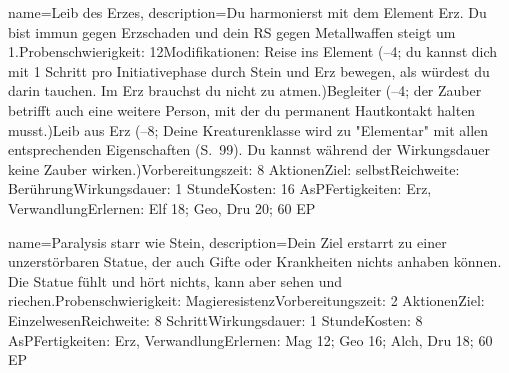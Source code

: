 {
    name={Leib des Erzes},
    description={Du harmonierst mit dem Element Erz. Du bist immun gegen Erzschaden und dein RS gegen Metallwaffen steigt um 1.\newline Probenschwierigkeit: 12\newline Modifikationen: Reise ins Element (–4; du kannst dich mit 1 Schritt pro Initiativephase durch Stein und Erz bewegen, als würdest du darin tauchen. Im Erz brauchst du nicht zu atmen.)\newline Begleiter (–4; der Zauber betrifft auch eine weitere Person, mit der du permanent Hautkontakt halten musst.)\newline Leib aus Erz (–8; Deine Kreaturenklasse wird zu "Elementar" mit allen entsprechenden Eigenschaften (S. 99). Du kannst während der Wirkungsdauer keine Zauber wirken.)\newline Vorbereitungszeit: 8 Aktionen\newline Ziel: selbst\newline Reichweite: Berührung\newline Wirkungsdauer: 1 Stunde\newline Kosten: 16 AsP\newline Fertigkeiten: Erz, Verwandlung\newline Erlernen: Elf 18; Geo, Dru 20; 60 EP}
}


{
    name={Paralysis starr wie Stein},
    description={Dein Ziel erstarrt zu einer unzerstörbaren Statue, der auch Gifte oder Krankheiten nichts anhaben können. Die Statue fühlt und hört nichts, kann aber sehen und riechen.\newline Probenschwierigkeit: Magieresistenz\newline Vorbereitungszeit: 2 Aktionen\newline Ziel: Einzelwesen\newline Reichweite: 8 Schritt\newline Wirkungsdauer: 1 Stunde\newline Kosten: 8 AsP\newline Fertigkeiten: Erz, Verwandlung\newline Erlernen: Mag 12; Geo 16; Alch, Dru 18; 60 EP}
}


